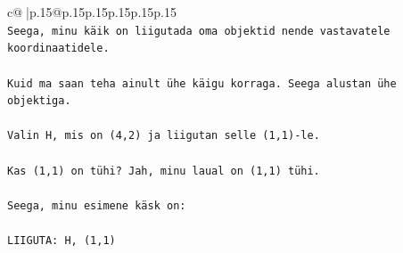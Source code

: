\documentclass{article}
\begin{document}
{\begin{supertabular}{c@{$\;$}|p{.15\linewidth}@{}p{.15\linewidth}p{.15\linewidth}p{.15\linewidth}p{.15\linewidth}p{.15\linewidth}}
{{{\\ 
\texttt{Seega, minu käik on liigutada oma objektid nende vastavatele koordinaatidele.} \\
\\ 
\texttt{Kuid ma saan teha ainult ühe käigu korraga. Seega alustan ühe objektiga.} \\
\\ 
\texttt{Valin H, mis on (4,2) ja liigutan selle (1,1){-}le.} \\
\\ 
\texttt{Kas (1,1) on tühi? Jah, minu laual on (1,1) tühi.} \\
\\ 
\texttt{Seega, minu esimene käsk on:} \\
\\ 
\texttt{LIIGUTA: H, (1,1)} \\
            }
        }
    }
     \\ \\


\end{supertabular}}
\end{document}
